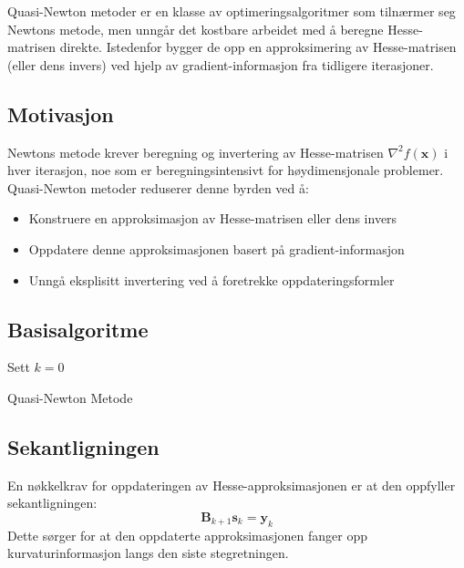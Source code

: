 Quasi-Newton metoder er en klasse av optimeringsalgoritmer som tilnærmer seg Newtons metode, men unngår det kostbare arbeidet med å beregne Hesse-matrisen direkte. Istedenfor bygger de opp en approksimering av Hesse-matrisen (eller dens invers) ved hjelp av gradient-informasjon fra tidligere iterasjoner.

\subsection{Motivasjon}
Newtons metode krever beregning og invertering av Hesse-matrisen \(\nabla^2 f(\symbf{x})\) i hver iterasjon, noe som er beregningsintensivt for høydimensjonale problemer. Quasi-Newton metoder reduserer denne byrden ved å:
\begin{itemize}
  \item Konstruere en approksimasjon av Hesse-matrisen eller dens invers
  \item Oppdatere denne approksimasjonen basert på gradient-informasjon
  \item Unngå eksplisitt invertering ved å foretrekke oppdateringsformler
\end{itemize}

\subsection{Basisalgoritme}
\begin{algorithm}[H]
  \SetAlgoLined

  Sett \( k = 0 \)\;
  \caption{Quasi-Newton Metode}
\end{algorithm}

\subsection{Sekantligningen}
En nøkkelkrav for oppdateringen av Hesse-approksimasjonen er at den oppfyller sekantligningen:
\[
  \symbf{B}_{k+1}\symbf{s}_k = \symbf{y}_k
\]
Dette sørger for at den oppdaterte approksimasjonen fanger opp kurvaturinformasjon langs den siste stegretningen.

